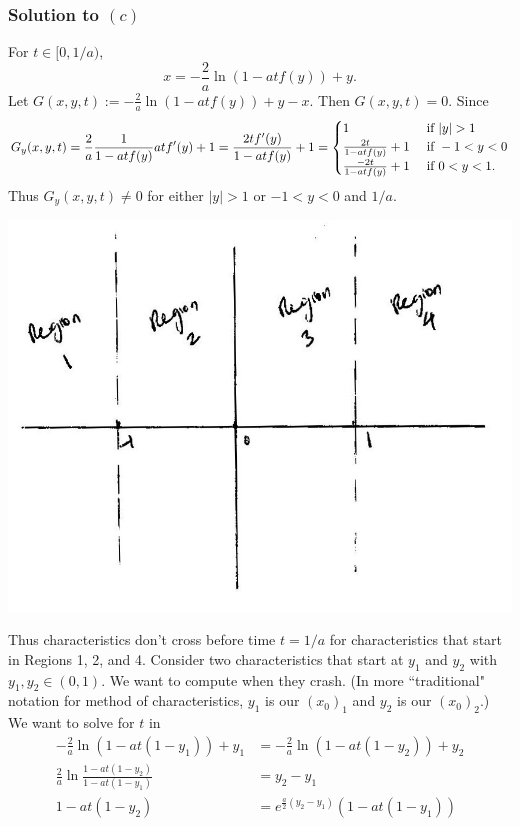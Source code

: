 \subsubsection*{Solution to $(c)$}
For $t \in [0, 1/a)$,
$$x = -\frac{2}{a}\ln(1 - atf(y)) + y.$$
Let $G(x, y, t) := -\frac{2}{a}\ln(1 - atf(y)) + y - x$. Then $G(x, y, t) = 0$.
Since
\begin{align*}
G_{y}(x, y, t) = \frac{2}{a}\frac{1}{1 - atf(y)}atf'(y) + 1 = \frac{2tf'(y)}{1 - atf(y)} + 1 =
\begin{cases}
1 & \text{ if } |y| > 1\\
\frac{2t}{1 - atf(y)} + 1 & \text{ if } -1 < y < 0\\
\frac{-2t}{1 - atf(y)} + 1 & \text{ if } 0 < y < 1.
\end{cases}
\end{align*}
Thus $G_{y}(x, y, t) \neq 0$ for either $|y| > 1$ or $-1 < y < 0$ and $1/a$.
%
%
%
%
\begin{center}
\includegraphics[scale = 0.75]{./_Figures/S07Q5c.jpg}
\end{center}
%
%
%
Thus characteristics don't cross before time $t = 1/a$ for characteristics that start in Regions 1, 2, and 4.
Consider two characteristics that start at $y_{1}$ and $y_{2}$ with $y_{1}, y_{2} \in (0, 1)$. We want to compute
when they crash. (In more ``traditional" notation for method of characteristics, $y_{1}$ is our $(x_{0})_{1}$ and $y_{2}$ is our $(x_{0})_{2}$.)
We want to solve for $t$ in
\begin{align*}
-\frac{2}{a}\ln(1 - at(1 - y_{1})) + y_{1} &= -\frac{2}{a}\ln(1 - at(1 - y_{2})) + y_{2}\\
\frac{2}{a}\ln\frac{1 - at(1 - y_{2})}{1 - at(1 - y_{1})} &= y_{2} - y_{1}\\
1 - at(1 - y_{2}) &= e^{\frac{a}{2}(y_{2} - y_{1})}(1 - at(1 - y_{1}))
\end{align*}
